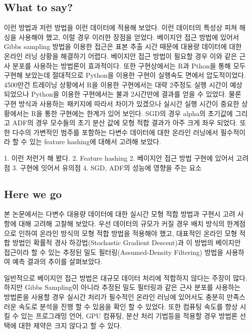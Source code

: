 \documentclass[oneside,b5paper,11pt]{article} %
\begin{document}
\subsection{What to say?}
 이런 방법과 저런 방법을 이런 데이터에 적용해 보았다. 이런 데이터의 특성상 피쳐 해싱을 사용해야 했고, 이럴 경우 이러한 장점을 얻었다.
베이지안 접근 방법에 있어서 Gibbs sampling 방법을 이용한 접근은 표본 추출 시간 때문에 대용량 데이터에 대한 온라인 러닝 상황을 해결하기 어렵다. 베이지안 접근 방법이 필요할 경우 이와 같은 근사 분포를 사용하는 방법론이 효과적이다. 
또한 구현상에서는 R과 Pthon을 통해 모두 구현해 보았는데 절대적으로 Python을 이용한 구현이 실행속도 면에서 압도적이었다. 4500만건 트레이닝 상황에서 R을 이용한 구현에서는 대략 2주정도 실행 시간이 예상되었으나 Python을 이용한 구현에서는 불과 2시간만에 결과를 얻을 수 있었다. 물론 구현 방식과 사용하는 패키지에 따라서 차이가 있겠으나 실시간 실행 시간이 중요한 상황에서는 R을 통한 구현에는 한계가 있어 보인다. 
SGD의 경우 alpha의 초기값에 그리고 ADF의 경우 모수들의 초기 분산 값에 모형 적합 결과가 아주 크게 좌우 되었다.
또한 다수의 가변적인 범주를 포함하는 다변수 데이터에 대한 온라인 러닝에서 필수적이라 할 수 있는 feature hashing에 대해서 고려해 보았다.

1. 이런 저런거 해 봤다.
2. Feature hashing
2. 베이지안 접근 방법 구현에 있어서 고려점
3. 구현에 잇어서 유의점
4. SGD, ADF의 성능에 영향을 주는 요소



\subsection{Here we go}
 본 논문에서는 다변수 대용량 데이터에 대한 실시간 모형 적합 방법과 구현시 고려 사항에 대해 고려해 고찰해 보았다. 우선 데이터의 규모가 커질 경우 배치 방식의 한계점으로 인하여 온라인 방식의 모형 적합 방법을 적용해야 했고, 대표적인 온라인 모형 적합 방법인 확률적 경사 하강법(Stochastic Gradient Descent)과 이 방법의 베이지안 접근이라 할 수 있는 추정된 밀도 필터링(Assumed-Density Filtering) 방법을 사용하여 예측 결과의 추이를 살펴보았다. 

일반적으로 베이지안 접근 방법은 대규모 데이터 처리에 적합하지 않다는 주장이 많다. 하지만 Gibbs Sampling이 아니라 추정된 밀도 필터링과 같은 근사 분포를 사용하는 방법론을 사용할 경우 실시간 처리가 필수적인 온라인 러닝에 있어서도 충분히 만족스러운 속도로 분석을 진행 할 수 있음을 확인 할 수 있었다. 또한 컴퓨팅 속도를 향상 시킬 수 있는 프로그래밍 언어, GPU 컴퓨팅, 분산 처리 기법등을 적용할 경우 방법론 선택에 대한 제약은 크지 않다고 할 수 있다.
\end{document}
